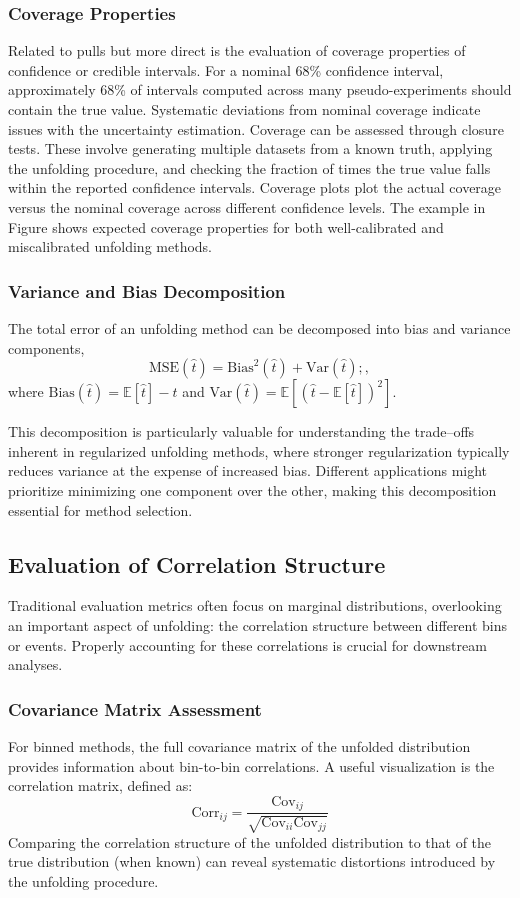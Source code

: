 \subsubsection{Coverage Properties}
Related to pulls but more direct is the evaluation of coverage properties of confidence or credible intervals.
%
For a nominal 68\% confidence interval, approximately 68\% of intervals computed across many pseudo-experiments should contain the true value.
%
Systematic deviations from nominal coverage indicate issues with the uncertainty estimation.
%
Coverage can be assessed through closure tests. These involve generating multiple datasets from a known truth, applying the unfolding procedure, and checking the fraction of times the true value falls within the reported confidence intervals.
%
Coverage plots plot the actual coverage versus the nominal coverage across different confidence levels.
%
The example in Figure  shows expected coverage properties for both well-calibrated and miscalibrated unfolding methods.
\subsubsection{Variance and Bias Decomposition}
The total error of an unfolding method can be decomposed into bias and variance components,
\begin{equation}
\text{MSE}(\hat{t}) = \text{Bias}^2(\hat{t}) + \text{Var}(\hat{t})
;,
\end{equation}
where \(\text{Bias}(\hat{t}) = \mathbb{E}[\hat{t}] - t\) and \(\text{Var}(\hat{t}) = \mathbb{E}[(\hat{t} - \mathbb{E}[\hat{t}])^2]\). 

This decomposition is particularly valuable for understanding the trade--offs inherent in regularized unfolding methods, where stronger regularization typically reduces variance at the expense of increased bias.
%
Different applications might prioritize minimizing one component over the other, making this decomposition essential for method selection.

\subsection{Evaluation of Correlation Structure}
Traditional evaluation metrics often focus on marginal distributions, overlooking an important aspect of unfolding: the correlation structure between different bins or events. Properly accounting for these correlations is crucial for downstream analyses.
\subsubsection{Covariance Matrix Assessment}
For binned methods, the full covariance matrix of the unfolded distribution provides information about bin-to-bin correlations. A useful visualization is the correlation matrix, defined as:
\begin{equation}
\text{Corr}_{ij} = \frac{\text{Cov}_{ij}}{\sqrt{\text{Cov}_{ii}\text{Cov}_{jj}}}
\end{equation}
Comparing the correlation structure of the unfolded distribution to that of the true distribution (when known) can reveal systematic distortions introduced by the unfolding procedure.
